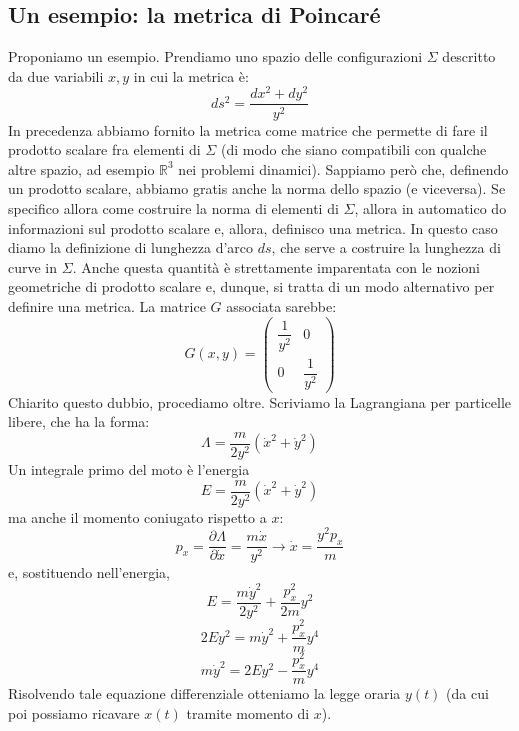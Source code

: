 \documentclass[a4paper,openany]{article}
\begin{document}
	\subsection{Un esempio: la metrica di Poincaré}
	Proponiamo un esempio. Prendiamo uno spazio delle configurazioni $\Sigma$ descritto da due variabili $x,y$ in cui la metrica è:
	$$
	ds^2 = \dfrac{dx^2 + dy^2}{y^2}
	$$
	In precedenza abbiamo fornito la metrica come matrice che permette di fare il prodotto scalare fra elementi di $\Sigma$ (di modo che siano compatibili con qualche altre spazio, ad esempio $\mathbb{R}^3$ nei problemi dinamici). Sappiamo però che, definendo un prodotto scalare, abbiamo gratis anche la norma dello spazio (e viceversa). Se specifico allora come costruire la norma di elementi di $\Sigma$, allora in automatico do informazioni sul prodotto scalare e, allora, definisco una metrica. In questo caso diamo la definizione di lunghezza d'arco $ds$, che serve a costruire la lunghezza di curve in $\Sigma$. Anche questa quantità è strettamente imparentata con le nozioni geometriche di prodotto scalare e, dunque, si tratta di un modo alternativo per definire una metrica. La matrice $G$ associata sarebbe:
	\begin{equation}\label{key}
		G(x,y) = 
		\begin{pmatrix}
			\dfrac{1}{y^2} & 0 \\
			0 & \dfrac{1}{y^2}
		\end{pmatrix}
	\end{equation}
	Chiarito questo dubbio, procediamo oltre. Scriviamo la Lagrangiana per particelle libere, che ha la forma:
	\begin{equation}\label{key}
		\Lambda = \dfrac{m}{2y^2}(\dot{x}^2+\dot{y}^2)
	\end{equation}
	Un integrale primo del moto è l'energia
	\begin{equation}\label{key}
		E = \dfrac{m}{2y^2}(\dot{x}^2+\dot{y}^2)
	\end{equation}
	ma anche il momento coniugato rispetto a $x$:
	\begin{equation}\label{key}
		p_{x} = \dfrac{\partial \Lambda}{\partial \dot{x}} = \dfrac{m\dot{x}}{y^2} \longrightarrow \dot{x} = \dfrac{y^2 p_x}{m}
	\end{equation}
	e, sostituendo nell'energia,
	\begin{equation}\label{key}
		E = \dfrac{m\dot{y}^2}{2y^2} + \dfrac{p_x^2}{2m}y^2
	\end{equation}
	$$
	2Ey^2 = m\dot{y}^2+ \dfrac{p_x^{2}}{m} y^4
	$$
	$$
	m\dot{y}^2 = 2Ey^2 - \dfrac{p_x^{2}}{m} y^4 
	$$
	Risolvendo tale equazione differenziale otteniamo la legge oraria $y(t)$ (da cui poi possiamo ricavare $x(t)$ tramite momento di $x$).
\end{document}
